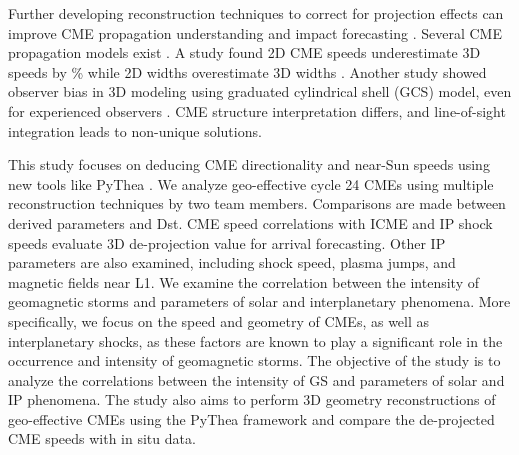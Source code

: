 Further developing reconstruction techniques to correct for projection effects can improve CME propagation understanding and impact forecasting \citep{thernisien_2009, mierla_2010, wood_2010, thernisien_2011}. Several CME propagation models exist \citep{odstrcil_2004, xie_2004, vrvsnak_2013, pomoell_2018}. A study found 2D CME speeds underestimate 3D speeds by \% while 2D widths overestimate 3D widths \citep{jang_2016}. Another study showed observer bias in 3D modeling using graduated cylindrical shell (GCS) model, even for experienced observers \citep{verbeke_2022}. CME structure interpretation differs, and line-of-sight integration leads to non-unique solutions.

This study focuses on deducing CME directionality and near-Sun speeds using new tools like PyThea \citep{kouloumvakos_2022}. We analyze geo-effective cycle 24 CMEs using multiple reconstruction techniques by two team members. Comparisons are made between derived parameters and Dst. CME speed correlations with ICME and IP shock speeds evaluate 3D de-projection value for arrival forecasting. Other IP parameters are also examined, including shock speed, plasma jumps, and magnetic fields near L1. We examine the correlation between the intensity of geomagnetic storms and parameters of solar and interplanetary phenomena. More specifically, we focus on the speed and geometry of CMEs, as well as interplanetary shocks, as these factors are known to play a significant role in the occurrence and intensity of geomagnetic storms. The objective of the study is to analyze the correlations between the intensity of GS and parameters of solar and IP phenomena. The study also aims to perform 3D geometry reconstructions of geo-effective CMEs using the PyThea framework and compare the de-projected CME speeds with in situ data.

